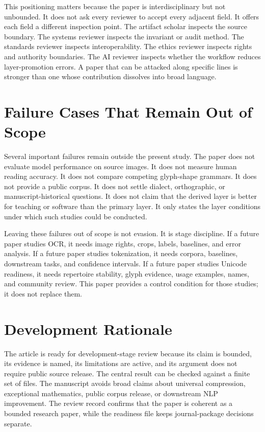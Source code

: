 \documentclass[sigconf,nonacm]{acmart}
\begin{document}
This positioning matters because the paper is interdisciplinary but not
unbounded. It does not ask every reviewer to accept every adjacent field. It
offers each field a different inspection point. The artifact scholar inspects
the source boundary. The systems reviewer inspects the invariant or audit
method. The standards reviewer inspects interoperability. The ethics reviewer
inspects rights and authority boundaries. The AI reviewer inspects whether the
workflow reduces layer-promotion errors. A paper that can be attacked along
specific lines is stronger than one whose contribution dissolves into broad
language.

\section{Failure Cases That Remain Out of Scope}
Several important failures remain outside the present study. The paper does not
evaluate model performance on source images. It does not measure human reading
accuracy. It does not compare competing glyph-shape grammars. It does not
provide a public corpus. It does not settle dialect, orthographic, or
manuscript-historical questions. It does not claim that the derived layer is
better for teaching or software than the primary layer. It only states the layer
conditions under which such studies could be conducted.

Leaving these failures out of scope is not evasion. It is stage discipline. If a
future paper studies OCR, it needs image rights, crops, labels, baselines, and
error analysis. If a future paper studies tokenization, it needs corpora,
baselines, downstream tasks, and confidence intervals. If a future paper studies
Unicode readiness, it needs repertoire stability, glyph evidence, usage
examples, names, and community review. This paper provides a control condition
for those studies; it does not replace them.

\section{Development Rationale}
The article is ready for development-stage review because its claim is bounded,
its evidence is named, its limitations are active, and its argument does not
require public source release. The central result can be checked against a
finite set of files. The manuscript avoids broad claims about universal
compression, exceptional mathematics, public corpus release, or downstream NLP
improvement. The review record confirms that the paper is coherent as a bounded
research paper, while the readiness file keeps journal-package decisions
separate.
\end{document}
